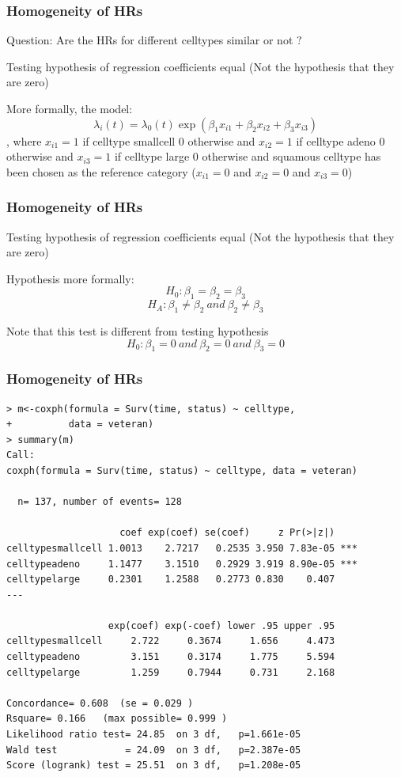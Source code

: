 \documentclass[12pt]{beamer}
\begin{document}
\begin{frame}[fragile]
\frametitle{Homogeneity of HRs}

Question: Are the HRs for different celltypes similar or not $?$ 

Testing hypothesis of regression coefficients equal (Not the hypothesis that they are zero)

More formally, the model: 
\[
\lambda_i(t) = \lambda_0(t)  \exp({\beta_1 x_{i1} + \beta_2 x_{i2} + \beta_3 x_{i3} })
\]
, where $x_{i1}=1$ if celltype smallcell 0 otherwise \newline
and $x_{i2}=1$ if celltype adeno 0 otherwise \newline
and $x_{i3}=1$ if celltype large 0 otherwise \newline
and squamous celltype has been chosen as the reference category
($x_{i1}=0$ and $x_{i2}=0$ and $x_{i3}=0$)


\end{frame}


\begin{frame}[fragile]
\frametitle{Homogeneity of HRs}


Testing hypothesis of regression coefficients equal (Not the hypothesis that they are zero)

Hypothesis more formally: 
$$
H_0: \beta_1=\beta_2=\beta_3 $$
$$
H_A: \beta_1 \ne \beta_2 \  and \ \beta_2 \ne \beta_3 
$$

Note that this test is different from testing hypothesis 
$$
H_0: \beta_1=0 \ and \ \beta_2=0 \ and \  \beta_3=0
$$

\end{frame}

\begin{frame}[fragile]
\frametitle{Homogeneity of HRs}

{\scriptsize \begin{verbatim}
> m<-coxph(formula = Surv(time, status) ~ celltype, 
+          data = veteran)
> summary(m)
Call:
coxph(formula = Surv(time, status) ~ celltype, data = veteran)

  n= 137, number of events= 128 

                    coef exp(coef) se(coef)     z Pr(>|z|)    
celltypesmallcell 1.0013    2.7217   0.2535 3.950 7.83e-05 ***
celltypeadeno     1.1477    3.1510   0.2929 3.919 8.90e-05 ***
celltypelarge     0.2301    1.2588   0.2773 0.830    0.407    
---

                  exp(coef) exp(-coef) lower .95 upper .95
celltypesmallcell     2.722     0.3674     1.656     4.473
celltypeadeno         3.151     0.3174     1.775     5.594
celltypelarge         1.259     0.7944     0.731     2.168

Concordance= 0.608  (se = 0.029 )
Rsquare= 0.166   (max possible= 0.999 )
Likelihood ratio test= 24.85  on 3 df,   p=1.661e-05
Wald test            = 24.09  on 3 df,   p=2.387e-05
Score (logrank) test = 25.51  on 3 df,   p=1.208e-05
\end{verbatim}
}
\end{frame}
\end{document}
